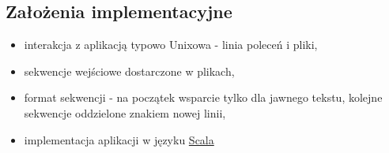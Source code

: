 \documentclass[12pt, a4paper]{article}
\begin{document}
\subsection{Założenia implementacyjne}
\begin{itemize}
\item interakcja z aplikacją typowo Unixowa - linia poleceń i pliki,
\item sekwencje wejściowe dostarczone w plikach,
\item format sekwencji - na początek wsparcie tylko dla jawnego tekstu, kolejne sekwencje oddzielone znakiem nowej linii,
\item implementacja aplikacji w języku \href{http://www.scala-lang.org/}{Scala}
\end{itemize}

\nocite{*}


\end{document}
